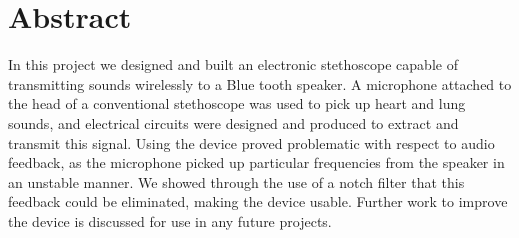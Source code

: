 \chapter*{Abstract}

In this project we designed and built an electronic stethoscope capable of transmitting sounds wirelessly to a Blue tooth speaker. A microphone attached to the head of a conventional stethoscope was used to pick up heart and lung sounds, and electrical circuits were designed and produced to extract and transmit this signal. Using the device proved problematic with respect to audio feedback, as the microphone picked up particular frequencies from the speaker in an unstable manner. We showed through the use of a notch filter that this feedback could be eliminated, making the device usable. Further work to improve the device is discussed for use in any future projects.